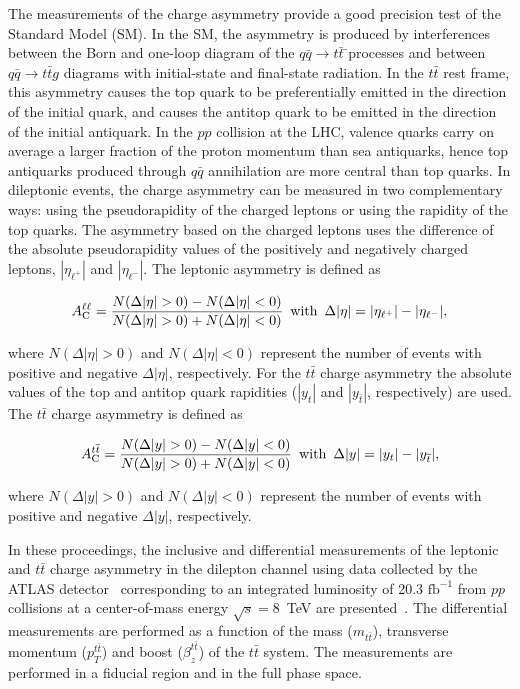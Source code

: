 \documentclass[12pt]{article}
\begin{document}
The measurements of the charge asymmetry provide a good precision test of the Standard Model (SM).  In the SM, the asymmetry is produced by interferences between the Born and one-loop diagram of the $q\bar{q} \rightarrow t\bar{t}$  ̄processes and between
$q\bar{q} \rightarrow t\bar{t}g$ diagrams with initial-state and final-state radiation. In the $t\bar{t}$ rest frame, this asymmetry causes the top quark to be preferentially emitted in the
direction of the initial quark, and causes the antitop quark to be emitted in the direction of the initial
antiquark. In the $pp$ collision at the LHC, valence quarks carry on average a larger fraction of the proton
momentum than sea antiquarks, hence top antiquarks produced through $q\bar{q}$ annihilation are
more central than top quarks. In dileptonic events, the charge asymmetry can be measured in two
 complementary ways: using the pseudorapidity of the charged leptons  or
using the rapidity of the top quarks.
The asymmetry based on the charged leptons uses the difference of the absolute pseudorapidity values of the positively and negatively charged leptons, $|\eta_{\ell^{+}}|$ and
$|\eta_{\ell^{-}}|$. The leptonic asymmetry is defined as
\begin{linenomath}
\begin{equation}
\label{eq:ac_lep}
A_{\rm{C}}^{\ell\ell} = \frac{N(\Delta |\eta| >0) - N(\Delta |\eta| <0)}{N(\Delta |\eta|
  >0) + N(\Delta |\eta| <0)} \, \, \, \textrm{with} \, \, \, \Delta |\eta| = |\eta_{\ell^{+}}|-|\eta_{\ell^{-}}|,
\end{equation}
\end{linenomath}
where $N(\Delta |\eta| >0)$ and $N(\Delta |\eta| <0)$ represent the number of events with
positive and negative $\Delta |\eta|$, respectively.
For the $t\bar{t}$ charge asymmetry the absolute values of the  top and antitop quark rapidities ($|y_{t}|$ and $|y_{\bar{t}}|$, respectively) are used. The $t\bar{t}$ charge asymmetry is defined as
\begin{linenomath}
\begin{equation}
\label{eq:ac}
A_{\rm{C}}^{t\bar{t}}= \frac{N(\Delta |y| > 0) - N(\Delta |y| < 0)}{N(\Delta |y|
  >0) + N(\Delta |y| <0)} \, \, \, \textrm{with} \, \, \, \Delta |y| = |y_{t}|-|y_{\bar{t}}|,
\end{equation}
\end{linenomath}
where $N(\Delta |y| > 0)$ and $N(\Delta |y| < 0)$ represent the number of events with
positive and negative $\Delta |y|$, respectively. 

In these proceedings, the inclusive and differential measurements of the leptonic and $t\bar{t}$ charge asymmetry  in the dilepton channel using  data collected by the ATLAS detector~\cite{atlas} corresponding to an integrated luminosity of  20.3 $\textrm{fb}^{-1}$ from $pp$ collisions at a center-of-mass energy $\sqrt{s} = 8$~TeV are presented~\cite{Aad:2016ove}. The differential measurements are performed as a function of the mass ($m_{t\bar{t}}$), transverse momentum ($p_T^{t\bar{t}}$) and boost ($\beta_{z}^{t\bar{t}}$) of the $t\bar{t}$ system. The measurements are performed in a fiducial region and in the full phase space.
\end{document}
